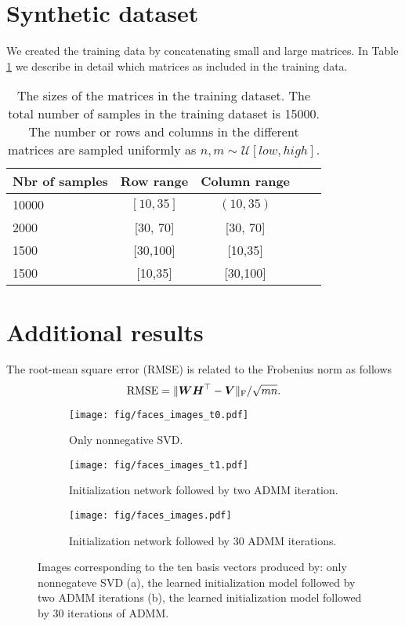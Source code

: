 \documentclass{article}
\begin{document}
\section{Synthetic dataset}\label{app:synthetic}
We created the training data by concatenating small and large matrices. In Table \ref{tab:training_data} we describe in detail which matrices as included in the training data.
\begin{table}[t]
\caption{The sizes of the matrices in the training dataset. The total number of samples in the training dataset is 15000. The number or rows and columns in the different matrices are sampled uniformly as $n,m\sim \mathcal{U}[low,high]$.}
\label{tab:training_data}
\vskip 0.15in
\begin{center}
\begin{small}
\begin{sc}
\begin{tabular}{lcccr}
\toprule
Nbr of samples & Row range & Column range\\
\midrule
10000& $[10, 35]$& $(10, 35)$ \\
2000&[30, 70]&[30, 70]\\
1500&[30,100]&[10,35] \\
1500&[10,35]&[30,100]\\
\bottomrule
\end{tabular}
\end{sc}
\end{small}
\end{center}
\vskip -0.1in
\end{table}

\section{Additional results}
The root-mean square error (RMSE) is related to the Frobenius norm as follows
\begin{equation}
    \text{RMSE} = \|{\bm{W}}{\bm{H}}^\top - {\bm{V}}\|_\text{F}/\sqrt{mn}.
\end{equation}

\begin{figure}[ht]
\centering
\begin{subfigure}{.9\linewidth}
\centering
\texttt{[image: fig/faces\_images\_t0.pdf]}%
\caption{Only nonnegative SVD.}%
\end{subfigure}\hfil
\vspace{0.2in}
\begin{subfigure}{.9\linewidth}
\centering
\texttt{[image: fig/faces\_images\_t1.pdf]}%
\caption{Initialization network followed by two ADMM iteration.}%
\end{subfigure}\hfil
\vspace{0.2in}
\begin{subfigure}{.9\linewidth}
\centering
\texttt{[image: fig/faces\_images.pdf]}%
\caption{Initialization network followed by 30 ADMM iterations.}%
\end{subfigure}%
\caption{Images corresponding
to the ten basis vectors produced by: only nonnegateve SVD (a), the learned initialization model followed by two ADMM iterations (b), the learned initialization model followed by 30 iterations of ADMM.}
\label{fig:many_faces}
\end{figure}
\end{document}
